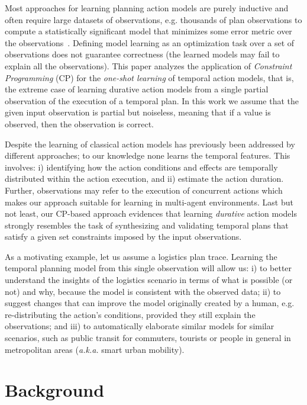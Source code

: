 \documentclass[runningheads]{llncs}
\begin{document}
Most approaches for learning planning action models are purely inductive and often require large datasets of observations, e.g. thousands of plan observations to compute a statistically significant model that minimizes some error metric over the observations~\cite{kuvcera2018louga,MouraoZPS12,yang2007learning,zhuo2013action}. Defining model learning as an optimization task over a set of observations does not guarantee correctness (the learned models may fail to explain all the observations). This paper analyzes the application of {\em Constraint Programming} (CP) for the {\em one-shot learning} of temporal action models, that is, the extreme case of learning durative action models from a single partial observation of the execution of a temporal plan. In this work we assume that the given input observation is partial but noiseless, meaning that if a value is observed, then the observation is correct.

Despite the learning of classical action models has previously been addressed by different approaches; to our knowledge none learns the temporal features. This involves: i) identifying how the action conditions and effects are temporally distributed within the action execution, and ii) estimate the action duration. Further, observations may refer to the execution of concurrent actions which makes our approach suitable for learning in multi-agent environments. Last but not least, our CP-based approach evidences that learning {\em durative} action models strongly resembles the task of synthesizing and validating temporal plans that satisfy a given set constraints imposed by the input observations. 

As a motivating example, let us assume a logistics plan trace. Learning the temporal planning model from this single observation will allow us: i) to better understand the insights of the logistics scenario in terms of what is possible (or not) and why, because the model is consistent with the observed data; ii) to suggest changes that can improve the model originally created by a human, e.g. re-distributing the action's conditions, provided they still explain the observations; and iii) to automatically elaborate similar models for similar scenarios, such as public transit for commuters, tourists or people in general in metropolitan areas (\emph{a.k.a.} smart urban mobility).



\section{Background}
\label{sec:background}
\end{document}
